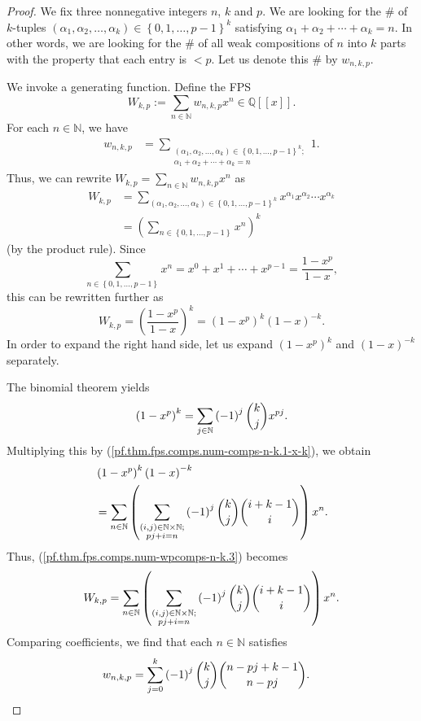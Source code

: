 \begin{proof}
We fix three nonnegative integers $n$, $k$ and $p$. We are
looking for the \# of $k$-tuples $\left(  \alpha_{1},\alpha_{2},\ldots
,\alpha_{k}\right)  \in\left\{  0,1,\ldots,p-1\right\}  ^{k}$ satisfying
$\alpha_{1}+\alpha_{2}+\cdots+\alpha_{k}=n$. In other words, we are looking
for the \# of all weak compositions of $n$ into $k$ parts with the property
that each entry is $<p$. Let us denote this \# by $w_{n,k,p}$.

We invoke a generating function. Define the FPS%
\[
W_{k,p}:=\sum_{n\in\mathbb{N}}w_{n,k,p}x^{n}\in\mathbb{Q}\left[  \left[
x\right]  \right]  .
\]
For each $n\in\mathbb{N}$, we have%
\begin{align*}
w_{n,k,p}
&  =\sum\limits_{\substack{\left(  \alpha_{1},\alpha_{2},\ldots,\alpha
_{k}\right)  \in\left\{  0,1,\ldots,p-1\right\}  ^{k};\\\alpha_{1}+\alpha
_{2}+\cdots+\alpha_{k}=n}}1.
\end{align*}
Thus, we can rewrite $W_{k,p}=\sum_{n\in\mathbb{N}}w_{n,k,p}x^{n}$ as%
\begin{align*}
W_{k,p}
&  =\sum\limits_{\left(  \alpha_{1},\alpha_{2},\ldots,\alpha_{k}\right)
\in\left\{  0,1,\ldots,p-1\right\}  ^{k}}x^{\alpha_{1}}x^{\alpha_{2}}\cdots
x^{\alpha_{k}}\\
&  =\left(  \sum_{n\in\left\{  0,1,\ldots,p-1\right\}  }x^{n}\right)  ^{k}%
\end{align*}
(by the product rule). Since%
\[
\sum_{n\in\left\{  0,1,\ldots,p-1\right\}  }x^{n}=x^{0}+x^{1}+\cdots
+x^{p-1}=\dfrac{1-x^{p}}{1-x},
\]
this can be rewritten further as%
\begin{equation}
W_{k,p}=\left(  \dfrac{1-x^{p}}{1-x}\right)  ^{k}=\left(  1-x^{p}\right)
^{k}\left(  1-x\right)  ^{-k}. \label{pf.thm.fps.comps.num-wpcomps-n-k.3}%
\end{equation}
In order to expand the right hand side, let us expand $\left(  1-x^{p}\right)
^{k}$ and $\left(  1-x\right)  ^{-k}$ separately.

The binomial theorem yields%
\[
\left(  1-x^{p}\right)  ^{k}=\sum_{j\in\mathbb{N}}\left(  -1\right)
^{j}\dbinom{k}{j}x^{pj}.
\]
Multiplying this by
(\ref{pf.thm.fps.comps.num-comps-n-k.1-x-k}), we obtain%
\begin{align*}
&  \left(  1-x^{p}\right)  ^{k}\left(  1-x\right)  ^{-k}\\
&  =\sum_{n\in\mathbb{N}}\left(  \sum_{\substack{\left(  i,j\right)
\in\mathbb{N}\times\mathbb{N};\\pj+i=n}}\left(  -1\right)  ^{j}\dbinom{k}%
{j}\dbinom{i+k-1}{i}\right)  x^{n}.
\end{align*}
Thus, (\ref{pf.thm.fps.comps.num-wpcomps-n-k.3}) becomes
\[
W_{k,p}=\sum
_{n\in\mathbb{N}}\left(  \sum_{\substack{\left(  i,j\right)  \in
\mathbb{N}\times\mathbb{N};\\pj+i=n}}\left(  -1\right)  ^{j}\dbinom{k}%
{j}\dbinom{i+k-1}{i}\right)  x^{n}.
\]
Comparing coefficients, we find that each $n\in\mathbb{N}$
satisfies%
\begin{align*}
w_{n,k,p}
&  =\sum_{j=0}^{k}\left(  -1\right)  ^{j}\dbinom{k}{j}\dbinom{n-pj+k-1}{n-pj}.
\end{align*}
\end{proof}

